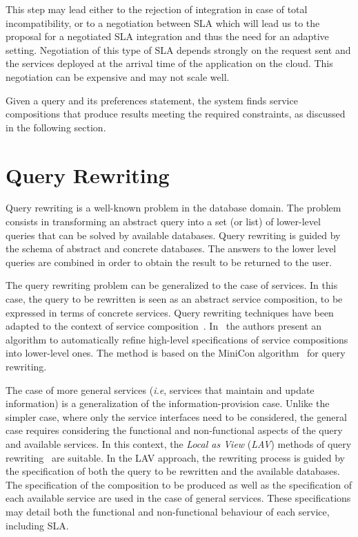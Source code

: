 This step may lead either to the rejection of integration in case of total incompatibility, or to a negotiation between SLA which will lead us to the proposal for a negotiated SLA integration and thus the need for an adaptive setting.
 Negotiation of this type of SLA depends strongly on the request sent and the services deployed at the arrival time of the application on the cloud. This negotiation can be expensive and may not scale well.
 
 Given a query and its preferences statement, the system  finds  service compositions that produce results   meeting the required constraints, as discussed in the following section.
 
\section{Query Rewriting}
\label{sec:queryRew}

Query rewriting is a well-known problem in the database domain.
The problem consists in transforming an abstract query into a set (or list) of lower-level queries that can be solved by  available databases.
Query rewriting is guided by the schema of  abstract and concrete databases.
The answers to the lower level queries are combined in order to obtain the result to be returned to the user.

The query rewriting problem can be generalized to the case of services.
In this case, the query to be rewritten is seen as an abstract service composition, to be expressed in terms of concrete services.
Query rewriting techniques have been adapted to the context of service composition~\cite{BBM10,ZLC11,CostaAMR13}. 
In~\cite{CostaAMR13} the authors present an algorithm to automatically refine high-level specifications of service compositions into lower-level ones. 
The method is based on the MiniCon algorithm~\cite{PH01} for query rewriting.

The case of more general services (\textit{i.e}, services that maintain and update information) is a generalization of the information-provision case.
Unlike the simpler case, where only the service interfaces need to be considered, the general case requires considering the functional and non-functional aspects of the query and available services.
In this context, the \textit{Local as View} (\textit{LAV}) methods of query rewriting~\cite{Levy2000} are suitable.
In the LAV approach, the rewriting process is guided by the specification of both the query to be rewritten and the available databases.
The specification of the composition to be produced as well as the specification of each available service are used in the case of general services.
These specifications may detail both the functional and non-functional behaviour of each service, including SLA.



